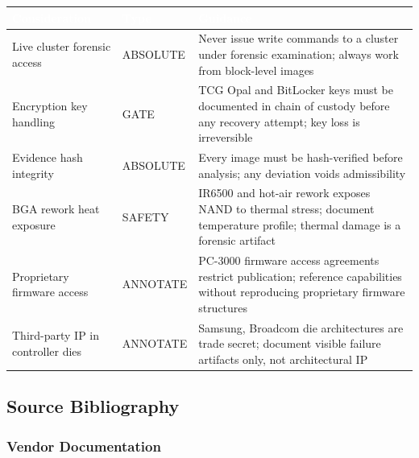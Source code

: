 \documentclass[11pt,letterpaper]{article}
\newcommand{\tableheader}[1]{\textbf{\sffamily\textcolor{white}{#1}}}
\begin{document}
\begin{center}
\begin{tabularx}{\textwidth}{L{3.5cm}L{2cm}X}
\toprule
{}
\tableheader{Consideration} & \tableheader{Type} & \tableheader{Guidance} \\
\midrule
Live cluster forensic access & ABSOLUTE & Never issue write commands to a cluster under forensic examination; always work from block-level images \\
Encryption key handling & GATE & TCG Opal and BitLocker keys must be documented in chain of custody before any recovery attempt; key loss is irreversible \\
Evidence hash integrity & ABSOLUTE & Every image must be hash-verified before analysis; any deviation voids admissibility \\
BGA rework heat exposure & SAFETY & IR6500 and hot-air rework exposes NAND to thermal stress; document temperature profile; thermal damage is a forensic artifact \\
Proprietary firmware access & ANNOTATE & PC-3000 firmware access agreements restrict publication; reference capabilities without reproducing proprietary firmware structures \\
Third-party IP in controller dies & ANNOTATE & Samsung, Broadcom die architectures are trade secret; document visible failure artifacts only, not architectural IP \\
\bottomrule
\end{tabularx}
\end{center}

\subsection{Source Bibliography}

\subsubsection{Vendor Documentation}
\end{document}
